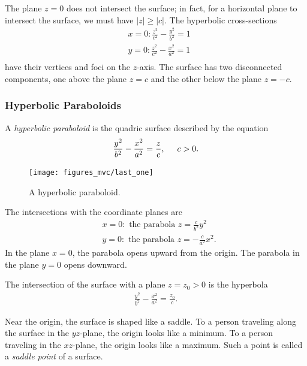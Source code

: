 \documentclass[12pt,letterpaper,reqno]{article}
\numberwithin{equation}{section}
\begin{document}
{The plane $z=0$ does not intersect the surface; in fact, for a horizontal plane to intersect the surface, we must have $|z|\geq |c|$. The hyperbolic cross-sections 
\begin{align*}
	&x=0: \frac{z^2}{c^2}-\frac{y^2}{b^2}=1 \\
	&y=0: \frac{z^2}{c^2}-\frac{x^2}{a^2}=1 \\
\end{align*}
have their vertices and foci on the $z$-axis. The surface has two disconnected components, one above the plane $z=c$ and the other below the plane $z=-c$.

\subsubsection{Hyperbolic Paraboloids}
\begin{defn}
	A \emph{hyperbolic paraboloid} is the quadric surface described by the equation
	\begin{align*}
		\frac{y^2}{b^2}-\frac{x^2}{a^2}=\frac{z}{c}, \hspace{0.5cm} c>0.
	\end{align*}
\end{defn}
\begin{figure}[h]
	\begin{center}
		\texttt{[image: figures\_mvc/last\_one]}
	\end{center}
	\caption{A hyperbolic paraboloid.}
\end{figure}
The intersections with the coordinate planes are
\begin{align*}
	&x=0: \text{ the parabola } z=\frac{c}{b^2}y^2 \\
	&y=0: \text{ the parabola } z=-\frac{c}{a^2}x^2. 
\end{align*}
In the plane $x=0$, the parabola opens upward from the origin. The parabola in the plane $y=0$ opens downward.

The intersection of the surface with a plane $z=z_0>0$ is the hyperbola
\begin{align*}
	\frac{y^2}{b^2}-\frac{x^2}{a^2}=\frac{z_0}{c}.
\end{align*}

Near the origin, the surface is shaped like a saddle. To a person traveling along the surface in the $yz$-plane, the origin looks like a minimum. To a person traveling in the $xz$-plane, the origin looks like a maximum. Such a point is called a \emph{saddle point} of a surface.

}
\end{document}

